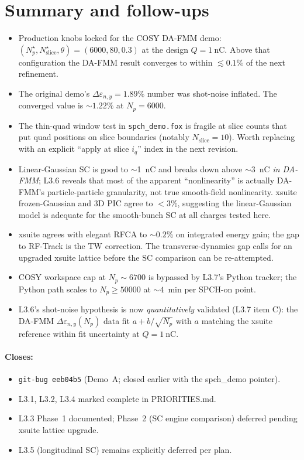 \documentclass[11pt]{article}
\begin{document}
\section{Summary and follow-ups}

\begin{itemize}
\item Production knobs locked for the COSY DA-FMM demo:
      $(N_p^\star, N_\mathrm{slice}^\star, \theta) = (6000, 80, 0.3)$
      at the design $Q=\SI{1}{\nano\coulomb}$. Above that
      configuration the DA-FMM result converges to within $\lesssim 0.1\%$
      of the next refinement.
\item The original demo's $\Delta\varepsilon_{n,y}=1.89\%$
      number was shot-noise inflated. The converged value is
      $\sim 1.22\%$ at $N_p=6000$.
\item The thin-quad window test in \texttt{spch\_demo.fox}
      is fragile at slice counts that put quad positions on
      slice boundaries (notably $N_\mathrm{slice}=10$). Worth
      replacing with an explicit ``apply at slice $i_q$'' index in
      the next revision.
\item Linear-Gaussian SC is good to $\sim$\SI{1}{\nano\coulomb}
      and breaks down above $\sim$\SI{3}{\nano\coulomb} \emph{in
      DA-FMM}; L3.6 reveals that most of the apparent ``nonlinearity''
      is actually DA-FMM's particle-particle granularity, not true
      smooth-field nonlinearity. xsuite frozen-Gaussian and 3D PIC
      agree to $<3\%$, suggesting the linear-Gaussian model is
      adequate for the smooth-bunch SC at all charges tested here.
\item xsuite agrees with elegant RFCA to $\sim 0.2\%$ on
      integrated energy gain; the gap to RF-Track is the TW
      correction. The transverse-dynamics gap calls for an upgraded
      xsuite lattice before the SC comparison can be re-attempted.
\item COSY workspace cap at $N_p\sim 6700$ is bypassed by L3.7's
      Python tracker; the Python path scales to $N_p \geq 50000$ at
      $\sim 4$~min per SPCH-on point.
\item L3.6's shot-noise hypothesis is now \emph{quantitatively}
      validated (L3.7 item C): the DA-FMM
      $\Delta\varepsilon_{n,y}(N_p)$ data fit
      $a + b/\sqrt{N_p}$ with $a$ matching the xsuite reference
      within fit uncertainty at $Q=\SI{1}{\nano\coulomb}$.
\end{itemize}

\paragraph{Closes:}
\begin{itemize}
\item \texttt{git-bug eeb04b5} (Demo~A; closed earlier with the
      spch\_demo pointer).
\item L3.1, L3.2, L3.4 marked complete in PRIORITIES.md.
\item L3.3 Phase~1 documented; Phase~2 (SC engine comparison)
      deferred pending xsuite lattice upgrade.
\item L3.5 (longitudinal SC) remains explicitly deferred per plan.
\end{itemize}
\end{document}
